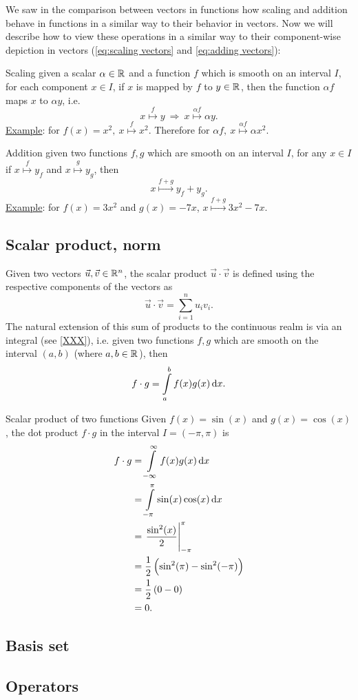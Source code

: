 We saw in the comparison between vectors in functions how scaling and addition behave in functions in a similar way to their behavior in vectors. Now we will describe how to view these operations in a similar way to their component-wise depiction in vectors (\autoref{eq:scaling vectors} and \autoref{eq:adding vectors}):
\begin{descitemize}
	\item[Scaling] given a scalar $\alpha\in\Rs$ and a function $f$ which is smooth on an interval $I$, for each component $x\in I$, if $x$ is mapped by $f$ to $y\in\Rs$, then the function $\alpha f$ maps $x$ to $\alpha y$, i.e.
		\[
			x\overset{f}{\mapsto} y\ \Rightarrow\ x\overset{\alpha f}{\mapsto} \alpha y.
		\]
		\underline{Example}: for $f(x)=x^{2},\ x\overset{f}{\mapsto} x^{2}$. Therefore for $\alpha f,\ x\overset{\alpha f}{\mapsto}\alpha x^{2}$.

	\item[Addition] given two functions $f,g$ which are smooth on an interval $I$, for any $x\in I$ if $x\overset{f}{\mapsto}y_{f}$ and $x\overset{g}{\mapsto}y_{g}$, then
		\[
			x\overset{f+g}{\mapsto} y_{f}+y_{g}.
		\]
		\underline{Example}: for $f(x)=3x^{2}$ and $g(x)=-7x$, $x\overset{f+g}{\mapsto}3x^{2}-7x$.
\end{descitemize}

\subsection{Scalar product, norm}
Given two vectors $\vec{u},\vec{v}\in\Rs[n]$, the scalar product $\vec{u}\cdot\vec{v}$ is defined using the respective components of the vectors as
\[
	\vec{u}\cdot\vec{v}=\sum\limits_{i=1}^{n}u_{i}v_{i}.
\]
The natural extension of this sum of products to the continuous realm is via an integral (see \autoref{XXX}), i.e. given two functions $f,g$ which are smooth on the interval $(a,b)$ (where $a,b\in\Rs$), then
\begin{equation}
	f\cdot g = \int\limits_{a}^{b}f(x)g(x)\dif x.
	\label{eq:scalar_product_functions}
\end{equation}

\begin{example}{Scalar product of two functions}{}
	Given $f(x)=\sin(x)$ and $g(x)=\cos(x)$, the dot product $f\cdot g$ in the interval $I=\left(-\pi,\pi\right)$ is
	\begin{align*}
		f\cdot g &= \int\limits_{-\infty}^{\infty}f(x)g(x)\dif x\\
				 &= \int\limits_{-\pi}^{\pi}\sin(x)\cos(x)\dif x\\
				 &= \left.\frac{\sin^{2}(x)}{2}\right|_{-\pi}^{\pi}\\
				 &= \frac{1}{2} \left( \sin^{2}(\pi)-\sin^{2}(-\pi) \right)\\
				 &= \frac{1}{2} \left( 0-0 \right)\\
				 &= 0.
	\end{align*}
\end{example}


\subsection{Basis set}

\subsection{Operators}
